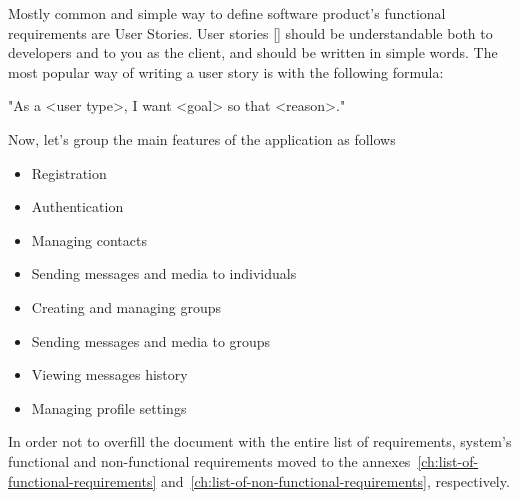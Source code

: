 Mostly common and simple way to define software product's functional requirements are User Stories.
User stories [\cite{cohn2004user}] should be understandable both to developers and to you as the client, and should be written in simple words.
The most popular way of writing a user story is with the following formula:

\begin{center}
    \begin{spverbatim}
        "As a <user type>, I want <goal> so that <reason>."
    \end{spverbatim}
\end{center}

Now, let's group the main features of the application as follows

\begin{itemize}
    \item Registration
    \item Authentication
    \item Managing contacts
    \item Sending messages and media to individuals
    \item Creating and managing groups
    \item Sending messages and media to groups
    \item Viewing messages history
    \item Managing profile settings
\end{itemize}

In order not to overfill the document with the entire list of requirements, system's functional and non-functional
requirements moved to the annexes~\ref{ch:list-of-functional-requirements} and~\ref{ch:list-of-non-functional-requirements},
respectively.